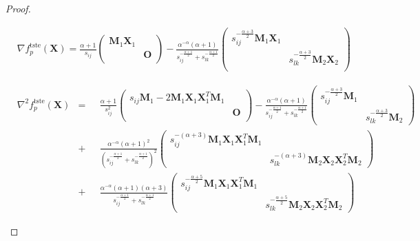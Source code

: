 \documentclass[./sbb_ordinal_embedding_aaai18.tex]{subfiles}%
\begin{document}
\begin{proof}
		\begin{figure*}[thb!]
			\begin{equation}
			\label{eq:gradient:student}
			\begin{aligned}
			& \nabla f^{\text{tste}}_p(\mathbf{X})=\frac{\alpha+1}{s_{ij}}\left(\begin{array}{cc}\mathbf{M}_1\mathbf{X}_1 & \\ & \mathbf{O} \\ \end{array}\right)-\frac{\alpha^{-\alpha}(\alpha+1)}{s_{ij}^{-\frac{\alpha+1}{2}}+s_{lk}^{-\frac{\alpha+1}{2}}}\left(\begin{array}{cc}s_{ij}^{-\frac{\alpha+3}{2}}\mathbf{M}_1\mathbf{X}_1 & \\ & s_{lk}^{-\frac{\alpha+3}{2}}\mathbf{M}_2\mathbf{X}_2 \\ \end{array}\right)
			\end{aligned}
			\end{equation}
		\end{figure*}
		
		\begin{figure*}[thb!]
			\begin{equation}
			\label{eq:hessian:student}
			\begin{aligned}
			& \nabla^2 f^{\text{tste}}_p(\mathbf{X}) &=&\ \ \ \frac{\alpha+1}{s_{ij}^2}\left(\begin{array}{cc}s_{ij}\mathbf{M}_1-2\mathbf{M}_1\mathbf{X}_1\mathbf{X}^T_1\mathbf{M}_1 & \\ & \mathbf{O} \\ \end{array}\right)-\frac{\alpha^{-\alpha}(\alpha+1)}{s_{ij}^{-\frac{\alpha+1}{2}}+s_{lk}^{-\frac{\alpha+1}{2}}}\left(\begin{array}{cc}s_{ij}^{-\frac{\alpha+3}{2}}\mathbf{M}_1 & \\ & s_{lk}^{-\frac{\alpha+3}{2}}\mathbf{M}_2\end{array}\right)\\
			& &+&\ \ \ \frac{\alpha^{-\alpha}(\alpha+1)^2}{\left(s_{ij}^{-\frac{\alpha+1}{2}}+s_{lk}^{-\frac{\alpha+1}{2}}\right)^2}\left(\begin{array}{cc}s_{ij}^{-(\alpha+3)}\mathbf{M}_1\mathbf{X}_1\mathbf{X}^T_1\mathbf{M}_1 & \\ & s_{lk}^{-(\alpha+3)}\mathbf{M}_2\mathbf{X}_2\mathbf{X}^T_2\mathbf{M}_2\end{array}\right)\\
			& &+&\ \ \ \frac{\alpha^{-\alpha}(\alpha+1)(\alpha+3)}{s_{ij}^{-\frac{\alpha+1}{2}}+s_{lk}^{-\frac{\alpha+1}{2}}}\left(\begin{array}{cc}s_{ij}^{-\frac{\alpha+5}{2}}\mathbf{M}_1\mathbf{X}_1\mathbf{X}_1^T\mathbf{M}_1 & \\ & s_{lk}^{-\frac{\alpha+5}{2}}\mathbf{M}_2\mathbf{X}_2\mathbf{X}_2^T\mathbf{M}_2\end{array}\right)
			\end{aligned}
			\end{equation}
		\end{figure*}
		

\end{proof}
\end{document}
